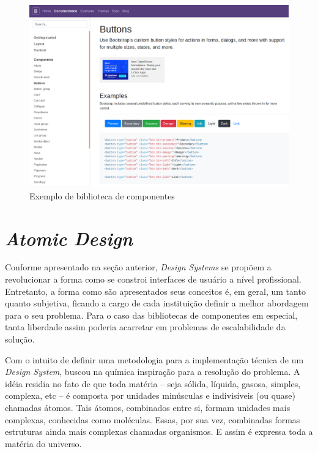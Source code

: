 \begin{figure}
	\includegraphics[width=\linewidth]{./04-figuras/02_referencial_teorico/bootstrap.png}
	\caption{Exemplo de biblioteca de componentes}
  \label{fig:bootstrapStyleGuide}
\end{figure}

\section{\textit{Atomic Design}}
\label{sec:atomicDesign}

Conforme apresentado na seção anterior, \textit{Design Systems} se propõem a revolucionar a forma como se constroi interfaces de usuário a nível profissional. Entretanto, a forma como são apresentados seus conceitos é, em geral, um tanto quanto subjetiva, ficando a cargo de cada instituição definir a melhor abordagem para o seu problema. Para o caso das bibliotecas de componentes em especial, tanta liberdade assim poderia acarretar em problemas de escalabilidade da solução.

Com o intuito de definir uma metodologia para a implementação técnica de um \textit{Design System}, \cite{frostAtomicDesign} buscou na química inspiração para a resolução do problema. A idéia residia no fato de que toda matéria -- seja sólida, líquida, gasosa, simples, complexa, etc -- é composta por unidades minúsculas e indivisíveis (ou quase) chamadas átomos. Tais átomos, combinados entre si, formam unidades mais complexas, conhecidas como moléculas. Essas, por sua vez, combinadas formas estruturas ainda mais complexas chamadas organismos. E assim é expressa toda a matéria do universo.

